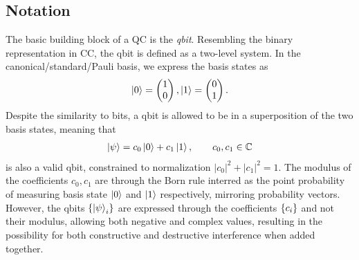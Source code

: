 \subsection{Notation}
The basic building block of a QC is the \textit{qbit}. Resembling the binary representation in CC, the qbit is defined as a two-level system. In the canonical/standard/Pauli basis, we express the basis states as
\begin{align*}
    \ket{0} = \begin{pmatrix}
        1 \\
        0
    \end{pmatrix}, \ket{1} = \begin{pmatrix}
        0 \\ 
        1
    \end{pmatrix}.
\end{align*}
Despite the similarity to bits, a qbit is allowed to be in a superposition of the two basis states, meaning that 
\begin{align*}
    \ket{\psi} = c_0 \ket{0} + c_1 \ket{1}, \hspace{20px} c_0,c_1 \in \mathbb{C}
\end{align*}
is also a valid qbit, constrained to normalization $|c_0|^2 + |c_1|^2 = 1$. The modulus of the coefficients $c_0,c_1$ are through the Born rule interred as the point probability of measuring basis state $\ket{0}$ and $\ket{1}$ respectively, mirroring probability vectors. However, the qbits $\{\ket{\psi}_i\}$ are expressed through the coefficients $\{c_i\}$ and not their modulus, allowing both negative and complex values, resulting in the possibility for both constructive and destructive interference when added together.

